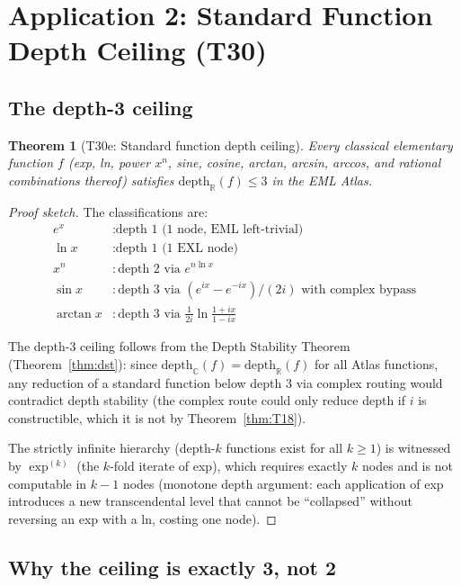 \documentclass[11pt]{article}
\newtheorem{theorem}{Theorem}[section]
\begin{document}
\section{Application 2: Standard Function Depth Ceiling (T30)}

\subsection{The depth-3 ceiling}

\begin{theorem}[T30e: Standard function depth ceiling]
\label{thm:ceil3}
Every classical elementary function $f$ (exp, ln, power $x^n$, sine, cosine,
arctan, arcsin, arccos, and rational combinations thereof) satisfies
$\mathrm{depth}_\mathbb{R}(f) \leq 3$ in the EML Atlas.
\end{theorem}

\begin{proof}[Proof sketch]
The classifications are:
\begin{align*}
  e^x &: \text{depth 1 (1 node, EML left-trivial)} \\
  \ln x &: \text{depth 1 (1 EXL node)} \\
  x^n &: \text{depth 2 via } e^{n \ln x} \\
  \sin x &: \text{depth 3 via } (e^{ix} - e^{-ix})/(2i) \text{ with complex bypass} \\
  \arctan x &: \text{depth 3 via } \frac{1}{2i}\ln\frac{1+ix}{1-ix}
\end{align*}

The depth-3 ceiling follows from the Depth Stability Theorem
(Theorem~\ref{thm:dst}): since $\mathrm{depth}_\mathbb{C}(f) = \mathrm{depth}_\mathbb{R}(f)$
for all Atlas functions, any reduction of a standard function below depth 3 via
complex routing would contradict depth stability (the complex route could only
reduce depth if $i$ is constructible, which it is not by Theorem~\ref{thm:T18}).

The strictly infinite hierarchy (depth-$k$ functions exist for all $k \geq 1$)
is witnessed by $\exp^{(k)}$ (the $k$-fold iterate of exp), which requires
exactly $k$ nodes and is not computable in $k-1$ nodes (monotone depth argument:
each application of exp introduces a new transcendental level that cannot be
``collapsed'' without reversing an exp with a ln, costing one node).
\end{proof}

\subsection{Why the ceiling is exactly 3, not 2}
\end{document}
